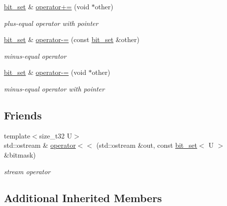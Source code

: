 \begin{DoxyCompactItemize}
\hyperlink{classcrap_1_1bit__set}{bit\-\_\-set} \& \hyperlink{classcrap_1_1bit__set_a59067fd5e5ebfe0e01fc459f0420e3b6}{operator+=} (void $\ast$other)
\begin{DoxyCompactList}\small\item\em plus-\/equal operator with pointer \end{DoxyCompactList}\item 
\hyperlink{classcrap_1_1bit__set}{bit\-\_\-set} \& \hyperlink{classcrap_1_1bit__set_afcfd210f22043f918f75e69253114106}{operator-\/=} (const \hyperlink{classcrap_1_1bit__set}{bit\-\_\-set} \&other)
\begin{DoxyCompactList}\small\item\em minus-\/equal operator \end{DoxyCompactList}\item 
\hyperlink{classcrap_1_1bit__set}{bit\-\_\-set} \& \hyperlink{classcrap_1_1bit__set_a67748b5ee0f8167126ce8d54736ec57d}{operator-\/=} (void $\ast$other)
\begin{DoxyCompactList}\small\item\em minus-\/equal operator with pointer \end{DoxyCompactList}\end{DoxyCompactItemize}
\subsection*{Friends}
\begin{DoxyCompactItemize}
\item 
{\footnotesize template$<$size\-\_\-t32 U$>$ }\\std\-::ostream \& \hyperlink{classcrap_1_1bit__set_a0b8ecaed0455cc93e7f32f14d08f391f}{operator$<$$<$} (std\-::ostream \&out, const \hyperlink{classcrap_1_1bit__set}{bit\-\_\-set}$<$ U $>$ \&bitmask)
\begin{DoxyCompactList}\small\item\em stream operator \end{DoxyCompactList}\end{DoxyCompactItemize}
\subsection*{Additional Inherited Members}


